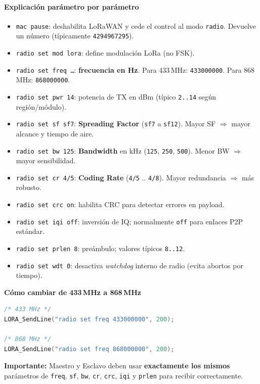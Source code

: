 \documentclass[a4paper,12pt]{article}
\begin{document}
\paragraph{Explicación parámetro por parámetro}
\begin{itemize}
  \item \texttt{mac pause}: deshabilita LoRaWAN y cede el control al modo \texttt{radio}. Devuelve un número (típicamente \texttt{4294967295}).
  \item \texttt{radio set mod lora}: define modulación LoRa (no FSK).
  \item \texttt{radio set freq \dots}: \textbf{frecuencia en Hz}. Para 433\,MHz: \texttt{433000000}. Para 868\,MHz: \texttt{868000000}.
  \item \texttt{radio set pwr 14}: potencia de TX en dBm (típico \texttt{2..14} según región/módulo).
  \item \texttt{radio set sf sf7}: \textbf{Spreading Factor} (\texttt{sf7} a \texttt{sf12}). Mayor SF $\Rightarrow$ mayor alcance y tiempo de aire.
  \item \texttt{radio set bw 125}: \textbf{Bandwidth} en kHz (\texttt{125}, \texttt{250}, \texttt{500}). Menor BW $\Rightarrow$ mayor sensibilidad.
  \item \texttt{radio set cr 4/5}: \textbf{Coding Rate} (\texttt{4/5} .. \texttt{4/8}). Mayor redundancia $\Rightarrow$ más robusto.
  \item \texttt{radio set crc on}: habilita CRC para detectar errores en payload.
  \item \texttt{radio set iqi off}: inversión de IQ; normalmente \texttt{off} para enlaces P2P estándar.
  \item \texttt{radio set prlen 8}: preámbulo; valores típicos \texttt{8..12}.
  \item \texttt{radio set wdt 0}: desactiva \textit{watchdog} interno de radio (evita abortos por tiempo).
\end{itemize}

\textbf{Cómo cambiar de 433\,MHz a 868\,MHz}

\begin{lstlisting}[language=C, caption={Frecuencia de operación}, label={lst:lora_freq}]
/* 433 MHz */
LORA_SendLine("radio set freq 433000000", 200);

/* 868 MHz */
LORA_SendLine("radio set freq 868000000", 200);
\end{lstlisting}

\noindent\textbf{Importante:} Maestro y Esclavo deben usar \textbf{exactamente los mismos} parámetros de \texttt{freq}, \texttt{sf}, \texttt{bw}, \texttt{cr}, \texttt{crc}, \texttt{iqi} y \texttt{prlen} para recibir correctamente.
\end{document}
